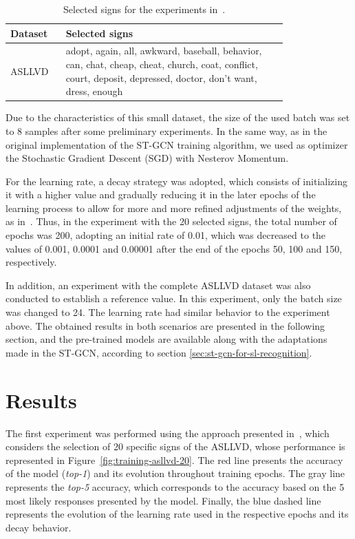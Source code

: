 \begin{table}[ht]
\centering
\caption{Selected signs for the experiments in~\cite{lim-2016}.}
\label{tab:asllvd-20}
\begin{tabular}{ l | p{0.8\linewidth} }
\hline
Dataset & Selected signs \\ \hline
ASLLVD & adopt, again, all, awkward, baseball, behavior, can, chat, cheap, cheat, church, coat, conflict, court, deposit, depressed, doctor, don’t want, dress, enough \\ \hline
\end{tabular}
\end{table}

\vspace{-4mm}

Due to the characteristics of this small dataset, the size of the used batch was set to 8 samples after some preliminary experiments. 
In the same way, as in the original implementation of the ST-GCN training algorithm, we used as optimizer the Stochastic Gradient Descent (SGD) with Nesterov Momentum. 

For the learning rate, a decay strategy was adopted, which consists of initializing it with a higher value and gradually reducing it in the later epochs of the learning process to allow for more and more refined adjustments of the weights, as in~\cite{st-gcn-2018}. Thus, in the experiment with the 20 selected signs, the total number of epochs was 200, adopting an initial rate of 0.01, which was decreased to the values of 0.001, 0.0001 and 0.00001 after the end of the epochs 50, 100 and 150, respectively.

In addition, an experiment with the complete ASLLVD dataset was also conducted to establish a reference value. In this experiment, only the batch size was changed to 24. The learning rate had similar behavior to the experiment above. The obtained results in both scenarios are presented in the following section, and the pre-trained models are available along with the adaptations made in the ST-GCN, according to section \ref{sec:st-gcn-for-sl-recognition}. \\[-8mm]


\section{Results} 
\label{sec:results}

The first experiment was performed using the approach presented in~\cite{lim-2016}, which considers the selection of 20 specific signs of the ASLLVD, whose performance is represented in Figure~\ref{fig:training-asllvd-20}. The red line presents the accuracy of the model (\textit{top-1}) and its evolution throughout training epochs. The gray line represents the \textit{top-5} accuracy, which corresponds to the accuracy based on the 5 most likely responses presented by the model. Finally, the blue dashed line represents the evolution of the learning rate used in the respective epochs and its decay behavior.


